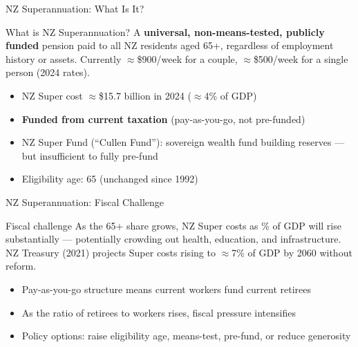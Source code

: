 \documentclass[aspectratio=169, 12pt]{beamer}
\begin{document}
\begin{frame}{NZ Superannuation: What Is It?}
  \begin{block}{What is NZ Superannuation?}
    A \textbf{universal, non-means-tested, publicly funded} pension paid to all NZ residents aged
    65+, regardless of employment history or assets. Currently $\approx$\$900/week for a couple,
    $\approx$\$500/week for a single person (2024 rates).
  \end{block}
  \begin{itemize}
    \item NZ Super cost $\approx$\$15.7 billion in 2024 ($\approx$4\% of GDP)
    \item \textbf{Funded from current taxation} (pay-as-you-go, not pre-funded)
    \item NZ Super Fund (``Cullen Fund''): sovereign wealth fund building reserves ---
          but insufficient to fully pre-fund
    \item Eligibility age: 65 (unchanged since 1992)
  \end{itemize}
\end{frame}

\begin{frame}{NZ Superannuation: Fiscal Challenge}
  \begin{alertblock}{Fiscal challenge}
    As the 65+ share grows, NZ Super costs as \% of GDP will rise substantially ---
    potentially crowding out health, education, and infrastructure.
    NZ Treasury (2021) projects Super costs rising to $\approx$7\% of GDP by 2060
    without reform.
  \end{alertblock}
  \begin{itemize}
    \item Pay-as-you-go structure means current workers fund current retirees
    \item As the ratio of retirees to workers rises, fiscal pressure intensifies
    \item Policy options: raise eligibility age, means-test, pre-fund, or reduce generosity
  \end{itemize}
\end{frame}
\end{document}
